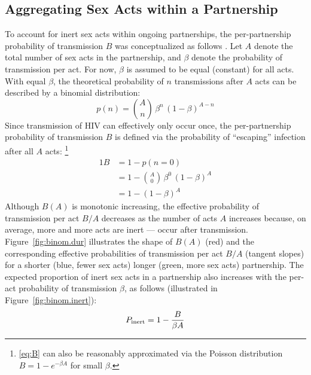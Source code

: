 \subsection{Aggregating Sex Acts within a Partnership}\label{foi.prior.bhom}
To account for inert sex acts within ongoing partnerships,
the per-partnership probability of transmission $B$ was conceptualized as follows \cite{Allard1990}.
Let $A$ denote the total number of sex acts in the partnership,
and $\beta$ denote the probability of transmission per act.
For now, $\beta$ is assumed to be equal (constant) for all acts.
With equal $\beta$, the theoretical probability of $n$ transmissions after $A$ acts
can be described by a binomial distribution:
\begin{equation}\label{eq:B.n}
  p(n) = {A \choose n}\,\beta^n\,{(1 - \beta)}^{A-n}
\end{equation}
Since transmission of HIV can effectively only occur once,
the per-partnership probability of transmission $B$ is defined via
the probability of ``escaping'' infection after all $A$ acts:%
\footnote{\eqref{eq:B} can also be reasonably approximated
  via the Poisson distribution $B = 1 - e^{-\beta A}$ for small $\beta$.}
\begin{alignat}{1}\label{eq:B}
  B &= 1 - p(n = 0) \nonumber\\
  &= 1 - {A \choose 0}\,\beta^0\,{(1 - \beta)}^{A} \nonumber\\
  &= 1 - {(1 - \beta)}^A
\end{alignat}
Although $B(A)$ is monotonic increasing,
the effective probability of transmission per act $B/A$
decreases as the number of acts $A$ increases because,
on average, more and more acts are inert --- \ie occur after transmission.
Figure~\ref{fig:binom.dur} illustrates the shape of $B(A)$ (red)
and the corresponding effective probabilities of transmission per act $B/A$ (tangent slopes)
for a shorter (blue, fewer sex acts) \vs longer (green, more sex acts) partnership.
The expected proportion of inert sex acts in a partnership
also increases with the per-act probability of transmission $\beta$,
as follows (illustrated in Figure~\ref{fig:binom.inert}):
\begin{equation}\label{eq:inert}
  P_{\textnormal{inert}} = 1 - \frac{B}{\beta A}
\end{equation}
